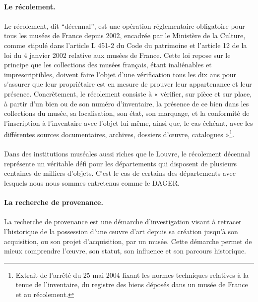 \documentclass[a4paper,12pt,twoside]{book}
\begin{document}
\paragraph{Le récolement.}
\paragraph{}
Le récolement, dit \enquote{décennal}, est une opération réglementaire obligatoire pour tous les musées de France depuis 2002, encadrée par le Ministère de la Culture, comme stipulé dans l’article L 451-2 du Code du patrimoine et l'article 12 de la loi du 4 janvier 2002 relative aux musées de France. Cette loi repose sur le principe que les collections des musées français, étant inaliénables et imprescriptibles, doivent faire l'objet d'une vérification tous les dix ans pour s'assurer que leur propriétaire est en mesure de prouver leur appartenance et leur présence. Concrètement, le récolement consiste à « vérifier, sur pièce et sur place, à partir d’un bien ou de son numéro d’inventaire, la présence de ce bien dans les collections du musée, sa localisation, son état, son marquage, et la conformité de l’inscription à l’inventaire avec l’objet lui-même, ainsi que, le cas échéant, avec les différentes sources documentaires, archives, dossiers d’œuvre, catalogues »\footnote{Extrait de l’arrêté du 25 mai 2004 fixant les normes techniques relatives à la tenue de l'inventaire, du registre des biens déposés dans un musée de France et au récolement.}. 

\paragraph{}
Dans des institutions muséales aussi riches que le Louvre, le récolement décennal représente un véritable défi pour les départements qui disposent de plusieurs centaines de milliers d’objets. C'est le cas de certains des départements avec lesquels nous nous sommes entretenus comme le DAGER. 

\paragraph{La recherche de provenance.}
\paragraph{}
La recherche de provenance est une démarche d’investigation visant à retracer l'historique de la possession d'une œuvre d'art depuis sa création jusqu'à son acquisition, ou son projet d'acquisition, par un musée. Cette démarche permet de mieux comprendre l'œuvre, son statut, son influence et son parcours historique.
\end{document}
